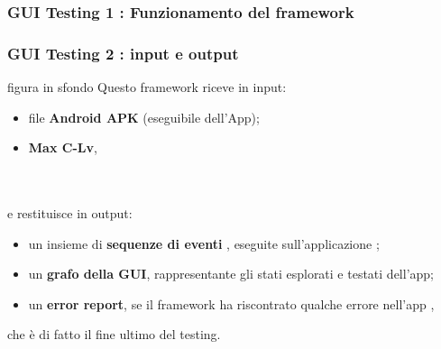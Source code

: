 \documentclass[12pt]{beamer}
\begin{document}
{

\begin{frame}
    \frametitle{GUI Testing 1 : Funzionamento del framework}



\end{frame}
}
{

\begin{frame}
\frametitle{GUI Testing 2 : input e output}
 figura in sfondo
    Questo framework riceve in input:
    \begin{itemize}
        \item file \textbf{Android APK} (eseguibile dell'App);
        \item \textbf{Max C-Lv},
    \end{itemize}
    \\~\\ 
    e restituisce in output:
    \begin{itemize}
        \item un insieme di \textbf{sequenze di eventi} , eseguite sull'applicazione ;
        \item un \textbf{grafo della GUI}, rappresentante gli stati esplorati e testati dell'app;
        \item un \textbf{error report}, se il framework ha riscontrato qualche errore nell'app ,
    \end{itemize}
    che \`e di fatto il fine ultimo del testing.


\end{frame}
}
\end{document}
